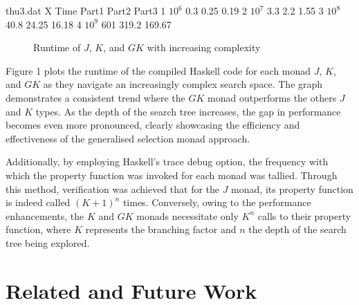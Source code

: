 \documentclass[runningheads]{llncs}
\begin{document}
\begin{filecontents}{thu3.dat}
X Time      Part1  Part2   Part3
1 $10^6$    0.3    0.25    0.19
2 $10^7$    3.3    2.2     1.55
3 $10^8$    40.8   24.25   16.18
4 $10^9$    601    319.2   169.67
\end{filecontents}
\begin{figure}[H]
\begin{center}
\end{center}
\caption{Runtime of $J$, $K$, and $GK$ with increasing complexity}
\end{figure}

Figure 1 plots the runtime of the compiled Haskell code for each monad
\(J\), \(K\), and \(GK\) as they navigate an increasingly complex search
space. The graph demonstrates a consistent trend where the \(GK\) monad
outperforms the others \(J\) and \(K\) types. As the depth of the search
tree increases, the gap in performance becomes even more pronounced,
clearly showcasing the efficiency and effectiveness of the generalised
selection monad approach.

Additionally, by employing Haskell's trace debug option, the frequency
with which the property function was invoked for each monad was tallied.
Through this method, verification was achieved that for the \(J\) monad,
its property function is indeed called \((K + 1)^n\) times. Conversely,
owing to the performance enhancements, the \(K\) and \(GK\) monads
necessitate only \(K^n\) calls to their property function, where \(K\)
represents the branching factor and \(n\) the depth of the search tree
being explored.

\section{Related and Future Work}\label{related-and-future-work}
\end{document}
